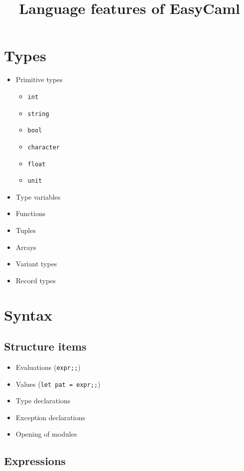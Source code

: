\documentclass{article}
\title{Language features of EasyCaml}
\author{}
\newcommand\otem{\item[\checkmark]}
\begin{document}
\maketitle

\section{Types}

\begin{multicols}{2}
\begin{itemize}
  \item Primitive types
	\begin{itemize}
	  \otem \texttt{int}
	  \item \texttt{string}
	  \item \texttt{bool}
	  \item \texttt{character}
	  \item \texttt{float}
	  \item \texttt{unit}
	\end{itemize}
  \otem Type variables
  \otem Functions 
  \item Tuples
  \item Arrays
  \item Variant types
  \item Record types
\end{itemize}
\end{multicols}

\section{Syntax}

\subsection{Structure items}

\begin{multicols}{2}
\begin{itemize}
  \otem Evaluations (\texttt{expr;;})
  \otem Values (\texttt{let pat = expr;;})
  \item Type declarations
  \item Exception declarations
  \item Opening of modules
\end{itemize}
\end{multicols}

\subsection{Expressions}
\end{document}
